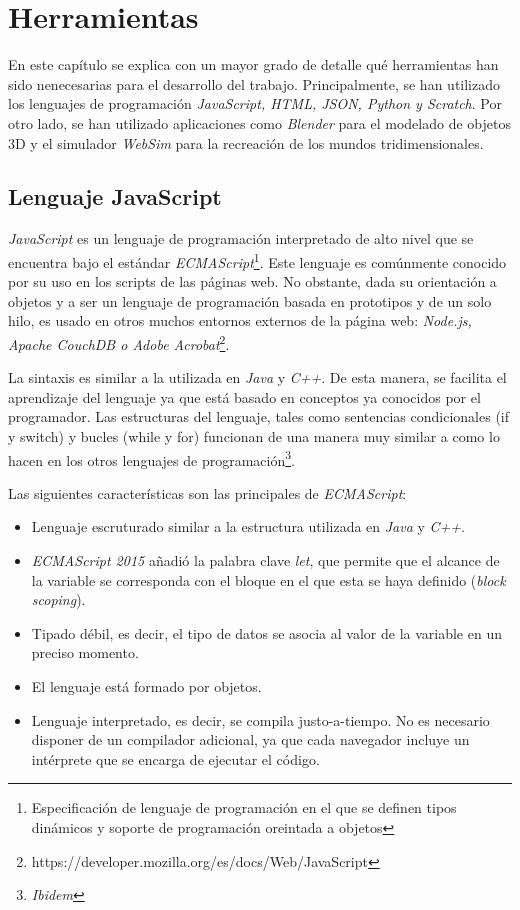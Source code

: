 \chapter{Herramientas}
\label{chap:herramientas} 
En este capítulo se explica con un mayor grado de detalle qué herramientas han sido nenecesarias para el desarrollo del trabajo. Principalmente, se han utilizado los lenguajes de programación \textit{JavaScript, HTML, JSON, Python y Scratch}. Por otro lado, se han utilizado aplicaciones como \textit{Blender} para el modelado de objetos 3D y el simulador \textit{WebSim} para la recreación de los mundos tridimensionales.
   
\section{Lenguaje JavaScript}
\textit{JavaScript} es un lenguaje de programación interpretado de alto nivel que se encuentra bajo el estándar \textit{ECMAScript}\footnote{Especificación de lenguaje de programación en el que se definen tipos dinámicos y soporte de programación oreintada a objetos}. Este lenguaje es comúnmente conocido por su uso en los scripts de las páginas web. No obstante, dada su orientación a objetos y a ser un lenguaje de programación basada en prototipos y de un solo hilo, es usado en otros muchos entornos externos de la página web: \textit{Node.js, Apache CouchDB o Adobe Acrobat}\footnote{https://developer.mozilla.org/es/docs/Web/JavaScript}. \newline

La sintaxis es similar a la utilizada en \textit{Java} y \textit{C++}. De esta manera, se facilita el aprendizaje del lenguaje ya que está basado en conceptos ya conocidos por el programador. Las estructuras del lenguaje, tales como sentencias condicionales (if y switch) y bucles (while y for) funcionan de una manera muy similar a como lo hacen en los otros lenguajes de programación\footnote{\textit{Ibidem}}. \newline

Las siguientes características son las principales de \textit{ECMAScript}:
\begin{itemize}
    \item Lenguaje escruturado similar a la estructura utilizada en \textit{Java} y \textit{C++}.
    \item \textit{ECMAScript 2015} añadió la palabra clave \textit{let}, que permite que el alcance de la variable se corresponda con el bloque en el que esta se haya definido (\textit{block scoping}).
    \item Tipado débil, es decir, el tipo de datos se asocia al valor de la variable en un preciso momento.
    \item El lenguaje está formado por objetos.
    \item Lenguaje interpretado, es decir, se compila justo-a-tiempo. No es necesario disponer de un compilador adicional, ya que cada navegador incluye un intérprete que se encarga de ejecutar el código.
\end{itemize}

